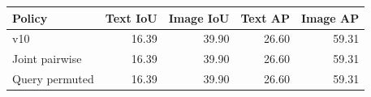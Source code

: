 \begin{tabular}{lrrrr}
\toprule
Policy & Text IoU & Image IoU & Text AP & Image AP \\
\midrule
v10 & 16.39 & 39.90 & 26.60 & 59.31 \\
Joint pairwise & 16.39 & 39.90 & 26.60 & 59.31 \\
Query permuted & 16.39 & 39.90 & 26.60 & 59.31 \\
\bottomrule
\end{tabular}
